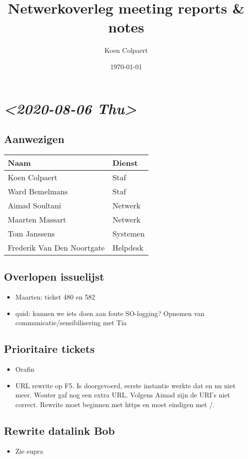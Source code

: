 \documentclass[11pt]{article}
\author{Koen Colpaert}
\date{\today}
\title{Netwerkoverleg meeting reports \& notes}
\begin{document}
\maketitle

\section{\textit{<2020-08-06 Thu>}}
\label{sec:orgf438421}
\subsection{Aanwezigen}
\label{sec:org0dcf804}
\begin{center}
\begin{tabular}{ll}
Naam & Dienst\\
\hline
Koen Colpaert & Staf\\
Ward Bemelmans & Staf\\
Aimad Soultani & Netwerk\\
Maarten Massart & Netwerk\\
Tom Janssens & Systemen\\
Frederik Van Den Noortgate & Helpdesk\\
\end{tabular}
\end{center}

\subsection{Overlopen issuelijst}
\label{sec:org10f090c}
\begin{itemize}
\item Maarten: ticket 480 en 582
\item quid: kunnen we iets doen aan foute SO-logging? Opnemen van communicatie/sensibilisering met Tia
\end{itemize}
\subsection{Prioritaire tickets}
\label{sec:orgf6a6d31}
\begin{itemize}
\item Orafin
\item URL rewrite op F5. Is doorgevoerd, eerste instantie werkte dat en nu niet meer. Wouter gaf nog een extra URL. Volgens Aimad zijn de URI's niet correct. Rewrite moet beginnen met https en moet eindigen met /.
\end{itemize}
\subsection{Rewrite datalink Bob}
\label{sec:org0a8db93}
\begin{itemize}
\item Zie supra
\end{itemize}
\end{document}

